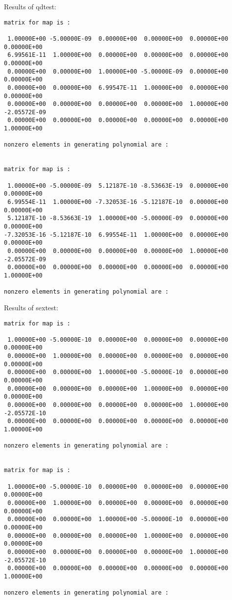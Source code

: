 Results of qdtest:
\begin{footnotesize}
\begin{verbatim}
matrix for map is :

 1.00000E+00 -5.00000E-09  0.00000E+00  0.00000E+00  0.00000E+00  0.00000E+00
 6.99561E-11  1.00000E+00  0.00000E+00  0.00000E+00  0.00000E+00  0.00000E+00
 0.00000E+00  0.00000E+00  1.00000E+00 -5.00000E-09  0.00000E+00  0.00000E+00
 0.00000E+00  0.00000E+00  6.99547E-11  1.00000E+00  0.00000E+00  0.00000E+00
 0.00000E+00  0.00000E+00  0.00000E+00  0.00000E+00  1.00000E+00 -2.05572E-09
 0.00000E+00  0.00000E+00  0.00000E+00  0.00000E+00  0.00000E+00  1.00000E+00

nonzero elements in generating polynomial are :


matrix for map is :

 1.00000E+00 -5.00000E-09  5.12187E-10 -8.53663E-19  0.00000E+00  0.00000E+00
 6.99554E-11  1.00000E+00 -7.32053E-16 -5.12187E-10  0.00000E+00  0.00000E+00
 5.12187E-10 -8.53663E-19  1.00000E+00 -5.00000E-09  0.00000E+00  0.00000E+00
-7.32053E-16 -5.12187E-10  6.99554E-11  1.00000E+00  0.00000E+00  0.00000E+00
 0.00000E+00  0.00000E+00  0.00000E+00  0.00000E+00  1.00000E+00 -2.05572E-09
 0.00000E+00  0.00000E+00  0.00000E+00  0.00000E+00  0.00000E+00  1.00000E+00

nonzero elements in generating polynomial are :

\end{verbatim}
\end{footnotesize}
Results of sextest:
\begin{footnotesize}
\begin{verbatim}
matrix for map is :

 1.00000E+00 -5.00000E-10  0.00000E+00  0.00000E+00  0.00000E+00  0.00000E+00
 0.00000E+00  1.00000E+00  0.00000E+00  0.00000E+00  0.00000E+00  0.00000E+00
 0.00000E+00  0.00000E+00  1.00000E+00 -5.00000E-10  0.00000E+00  0.00000E+00
 0.00000E+00  0.00000E+00  0.00000E+00  1.00000E+00  0.00000E+00  0.00000E+00
 0.00000E+00  0.00000E+00  0.00000E+00  0.00000E+00  1.00000E+00 -2.05572E-10
 0.00000E+00  0.00000E+00  0.00000E+00  0.00000E+00  0.00000E+00  1.00000E+00

nonzero elements in generating polynomial are :


matrix for map is :

 1.00000E+00 -5.00000E-10  0.00000E+00  0.00000E+00  0.00000E+00  0.00000E+00
 0.00000E+00  1.00000E+00  0.00000E+00  0.00000E+00  0.00000E+00  0.00000E+00
 0.00000E+00  0.00000E+00  1.00000E+00 -5.00000E-10  0.00000E+00  0.00000E+00
 0.00000E+00  0.00000E+00  0.00000E+00  1.00000E+00  0.00000E+00  0.00000E+00
 0.00000E+00  0.00000E+00  0.00000E+00  0.00000E+00  1.00000E+00 -2.05572E-10
 0.00000E+00  0.00000E+00  0.00000E+00  0.00000E+00  0.00000E+00  1.00000E+00

nonzero elements in generating polynomial are :

\end{verbatim}
\end{footnotesize}
